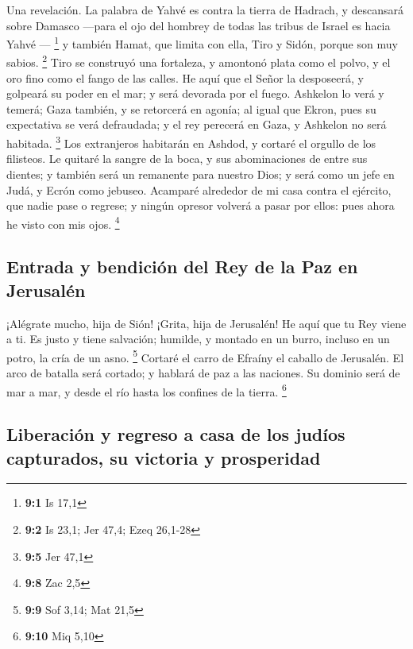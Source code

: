 Una revelación. La palabra de Yahvé es contra la tierra
de Hadrach, y descansará sobre Damasco ---para el ojo del hombrey de
todas las tribus de Israel es hacia Yahvé --- \footnote{\textbf{9:1} Is
  17,1}  y también Hamat, que limita con ella, Tiro y
Sidón, porque son muy sabios. \footnote{\textbf{9:2} Is 23,1; Jer 47,4;
  Ezeq 26,1-28}  Tiro se construyó una fortaleza, y
amontonó plata como el polvo, y el oro fino como el fango de las calles.
 He aquí que el Señor la desposeerá, y golpeará su poder
en el mar; y será devorada por el fuego.  Ashkelon lo verá
y temerá; Gaza también, y se retorcerá en agonía; al igual que Ekron,
pues su expectativa se verá defraudada; y el rey perecerá en Gaza, y
Ashkelon no será habitada. \footnote{\textbf{9:5} Jer 47,1}
 Los extranjeros habitarán en Ashdod, y cortaré el orgullo
de los filisteos.  Le quitaré la sangre de la boca, y sus
abominaciones de entre sus dientes; y también será un remanente para
nuestro Dios; y será como un jefe en Judá, y Ecrón como jebuseo.
 Acamparé alrededor de mi casa contra el ejército, que
nadie pase o regrese; y ningún opresor volverá a pasar por ellos: pues
ahora he visto con mis ojos. \footnote{\textbf{9:8} Zac 2,5}

\hypertarget{entrada-y-bendiciuxf3n-del-rey-de-la-paz-en-jerusaluxe9n}{%
\subsection{Entrada y bendición del Rey de la Paz en
Jerusalén}\label{entrada-y-bendiciuxf3n-del-rey-de-la-paz-en-jerusaluxe9n}}

 ¡Alégrate mucho, hija de Sión! ¡Grita, hija de Jerusalén!
He aquí que tu Rey viene a ti. Es justo y tiene salvación; humilde, y
montado en un burro, incluso en un potro, la cría de un asno.
\footnote{\textbf{9:9} Sof 3,14; Mat 21,5}  Cortaré el
carro de Efraíny el caballo de Jerusalén. El arco de batalla será
cortado; y hablará de paz a las naciones. Su dominio será de mar a mar,
y desde el río hasta los confines de la tierra. \footnote{\textbf{9:10}
  Miq 5,10}

\hypertarget{liberaciuxf3n-y-regreso-a-casa-de-los-juduxedos-capturados-su-victoria-y-prosperidad}{%
\subsection{Liberación y regreso a casa de los judíos capturados, su
victoria y
prosperidad}\label{liberaciuxf3n-y-regreso-a-casa-de-los-juduxedos-capturados-su-victoria-y-prosperidad}}


